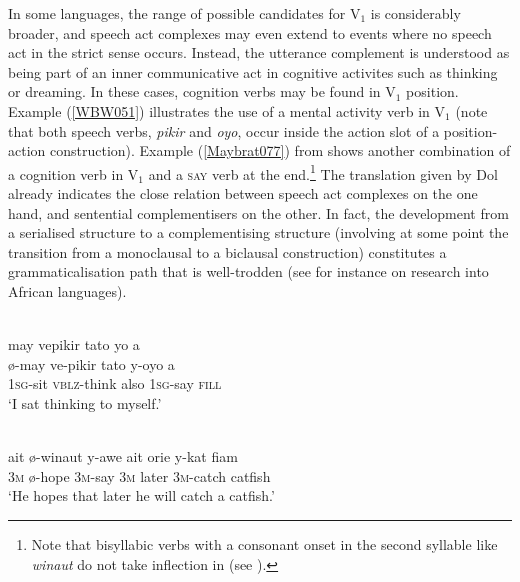 In some languages, the range of possible candidates for V$_{1}$ is considerably broader, and speech act complexes may even extend to events where no speech act in the strict sense occurs. Instead, the utterance complement is understood as being part of an inner communicative act in cognitive activites such as thinking or dreaming. In these cases, cognition verbs may be found in V$_{1}$ position. Example (\ref{WBW051}) illustrates the use of a mental activity verb in V$_{1}$ (note that both speech verbs, \textit{pikir} and \textit{oyo}, occur inside the action slot of a position-action construction). Example (\ref{Maybrat077}) from  shows another combination of a cognition verb in V$_{1}$ and a \textsc{say} verb at the end.\footnote{Note that bisyllabic verbs with a consonant onset in the second syllable like \textit{winaut} do not take inflection in  (see \citealt[52]{dol2007grammar}).} The translation given by Dol already indicates the close relation between speech act complexes on the one hand, and sentential complementisers on the other. In fact, the development from a serialised structure to a complementising structure (involving at some point the transition from a monoclausal to a biclausal construction) constitutes a grammaticalisation path that is well-trodden (see for instance \citealt{lord1993historical} on research into African languages).

\ea \label{WBW051}
\\
\glll may vepikir tato yo a \\
ø-may ve-pikir tato y-oyo a \\
\textsc{1}\textsc{sg}-sit \textsc{vblz}-think also \textsc{1}\textsc{sg}-say \textsc{fill} \\
\glft `I sat thinking to myself.'\\ 
\z

\ea \label{Maybrat077}
\\
\gll ait ø-winaut y-awe ait orie y-kat fiam \\
\textsc{3}\textsc{m} ø-hope \textsc{3}\textsc{m}-say \textsc{3}\textsc{m} later \textsc{3}\textsc{m}-catch catfish \\
\glft `He hopes that later he will catch a catfish.'\\ 
\z

